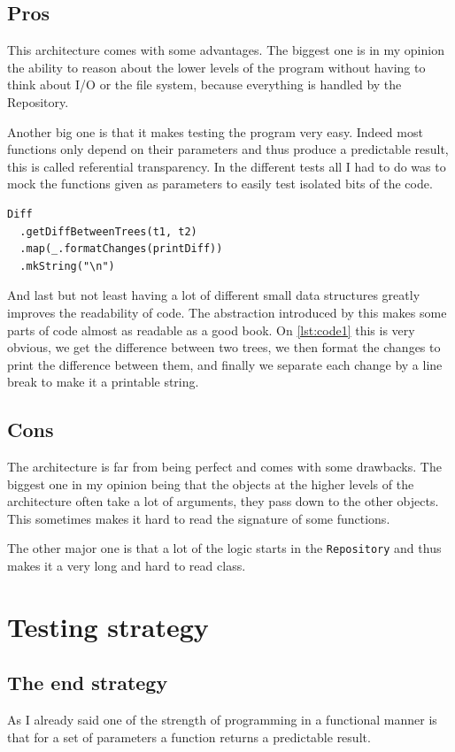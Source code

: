 \documentclass[12pt,a4paper]{scrartcl}
\begin{document}
\subsection{Pros}
This architecture comes with some advantages. The biggest one is in my opinion
the ability to reason about the lower levels of the program without
having to think about I/O or the file system, because everything is handled by
the  Repository.

Another big one is that it makes testing the program very easy. Indeed most
functions only depend on their parameters and thus produce a predictable
result, this is called referential transparency. In the different tests all I
had to do was to mock the functions given as parameters to easily test isolated
bits of the code.

\begin{lstlisting}[caption = Scala code example, label = lst:code1]
Diff
  .getDiffBetweenTrees(t1, t2)
  .map(_.formatChanges(printDiff))
  .mkString("\n")
\end{lstlisting}

And last but not least having a lot of different small data structures greatly
improves the readability of code. The abstraction introduced by this makes some
parts of code almost as readable as a good book. On \cref{lst:code1} this is
very obvious, we get the difference between two trees, we then format the
changes to print the difference between them, and finally we separate each
change by a line break to make it a printable string.

\subsection{Cons}
The architecture is far from being perfect and comes with some drawbacks. The
biggest one in my opinion being that the objects at the higher levels of the
architecture often take a lot of arguments, they pass down to the other
objects. This sometimes makes it hard to read the signature of some functions.

The other major one is that a lot of the logic starts in the
\lstinline{Repository} and thus makes it a very long and hard to read class.

\section{Testing strategy}

\subsection{The end strategy}
As I already said one of the strength of programming in a functional manner is
that for a set of parameters a function returns a predictable result.
\end{document}
